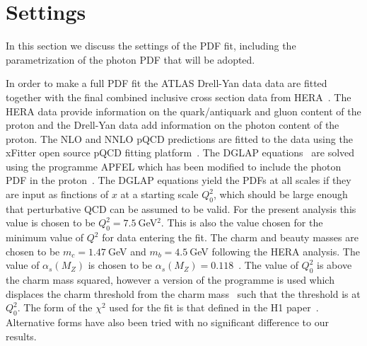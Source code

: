 \section{Settings}
\label{sec:fitsettings}

In this section we discuss the settings of
the PDF fit, including the parametrization of the photon PDF
that will be adopted.

In order to make a full PDF fit the  ATLAS Drell-Yan data data are fitted together with the final combined inclusive 
cross section data from HERA~\cite{Abramowicz:2015mha}.
%
The HERA data provide information on the quark/antiquark and gluon content of 
the proton and the Drell-Yan data add information on the photon content of the proton.
%
The NLO and NNLO pQCD predictions are fitted to the data using the xFitter open source pQCD fitting platform~\cite{xFitter}.
The DGLAP equations~\cite{dglap} are solved using the programme APFEL which has been modified to include 
the photon PDF in the proton~\cite{Bertone:2013vaa}.
%
The DGLAP equations yield the PDFs at all scales if they are input as finctions of $x$ at a starting scale $Q^2_0$, which 
should be large enough that perturbative QCD can be assumed to be valid. For the present analysis this value is chosen
to be $Q^2_0 = 7.5~$GeV$^2$.
%
This is also the value chosen for the minimum value of $Q^2$ for data entering the fit.
The charm and beauty masses are chosen to be $m_c=1.47~$GeV and $m_b=4.5~$GeV following the HERA analysis. 
The value of $\alpha_s(M_Z)$ is chosen to be $\alpha_s(M_Z)=0.118$~\cite{PDG}. 
The value of $Q^2_0$ is above the charm mass squared, however a version of the programme 
is used which displaces the charm threshold from the charm mass~\cite{charmthresh} such that the threshold is at $Q^2_0$.
%
The form of the $\chi^2$ used for the fit is that defined in the H1 paper~\cite{h1chisqdef}. 
Alternative forms have also been tried with no significant difference to our results.
 
